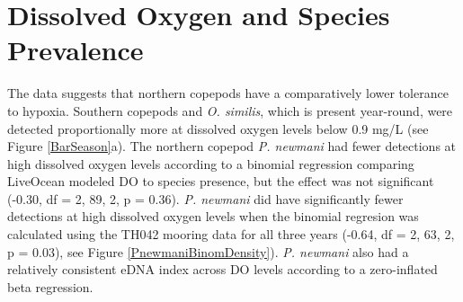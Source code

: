 \documentclass[12pt,twoside]{reedthesis}
\begin{document}
{	\section{Dissolved Oxygen and Species Prevalence} 
	
	The data suggests that northern copepods have a comparatively lower tolerance to hypoxia. Southern copepods and \textit{O. similis}, which is present year-round, were detected proportionally more at dissolved oxygen levels below 0.9 mg/L (see Figure \ref{BarSeason}a). 
	The northern copepod \textit{P. newmani} had fewer detections at high dissolved oxygen levels according to a binomial regression comparing LiveOcean modeled DO to species presence, but the effect was not significant (-0.30, df = 2, 89, 2, p = 0.36). \textit{P. newmani} did have significantly fewer detections at high dissolved oxygen levels when the binomial regresion was calculated using the TH042 mooring data for all three years (-0.64, df = 2, 63, 2, p = 0.03), see Figure \ref{PnewmaniBinomDensity}). 
	\textit{P. newmani} also had a relatively consistent eDNA index across DO levels according to a zero-inflated beta regression. 
	
}
\end{document}
